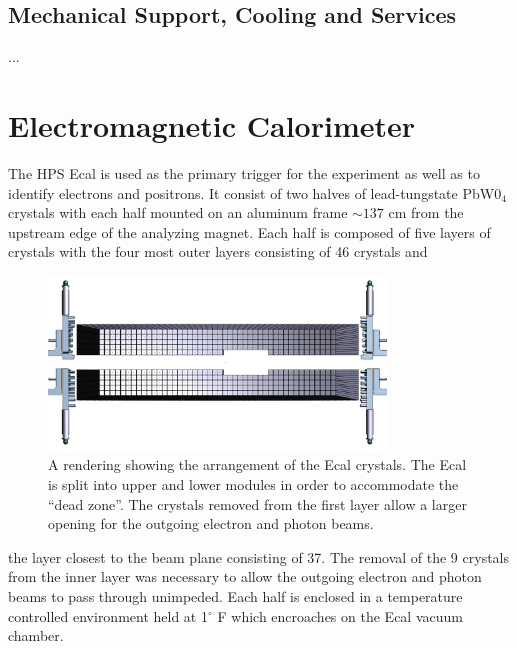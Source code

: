 \subsection{Mechanical Support, Cooling and Services}

...


\section{Electromagnetic Calorimeter}

The HPS Ecal is used as the primary trigger for the experiment as well as to
identify electrons and positrons.  It consist of two halves of lead-tungstate 
PbW0$_4$ crystals with each half mounted on an aluminum frame $\sim 137$ cm 
from the upstream edge of the analyzing magnet.  Each half is composed of five
layers of crystals with the four most outer layers consisting of 46 crystals and 
\begin{figure}
    \centering
    \includegraphics[width=0.8\textwidth]{images/ecal_layout.png}
    \caption{A rendering showing the arrangement of the Ecal crystals.  The Ecal
             is split into upper and lower modules in order to accommodate the 
             ``dead zone''.  The crystals removed from the first layer allow
             a larger opening for the outgoing electron and photon beams.}
    \label{fig:ecal_layout}
\end{figure}
the layer closest to the beam plane consisting of 37. The removal of the 9 
crystals from the inner layer was necessary to allow the outgoing electron and
photon beams to pass through unimpeded.  Each half is enclosed in a temperature
controlled environment held at 1$^{\circ}$ F which encroaches on the Ecal 
vacuum chamber.


